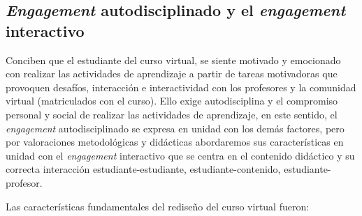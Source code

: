 \documentclass[spanish]{textolivre}
\begin{document}
\subsection{\emph{Engagement} autodisciplinado y el \emph{engagement} interactivo}
Conciben que el estudiante del curso virtual, se siente motivado y emocionado con realizar las actividades de aprendizaje a partir de tareas motivadoras que provoquen desafíos, interacción e interactividad \cite{mohd2020} %
con los profesores y la comunidad virtual (matriculados con el curso). Ello exige autodisciplina y el compromiso personal y social de realizar las actividades de aprendizaje, en este sentido, el \emph{engagement} autodisciplinado se expresa en unidad con los demás factores, pero por valoraciones metodológicas y didácticas abordaremos sus características en unidad con el \emph{engagement} interactivo que se centra en el contenido didáctico y su correcta interacción estudiante-estudiante, estudiante-contenido, estudiante-profesor.

Las características fundamentales del rediseño del curso virtual fueron:
\end{document}
